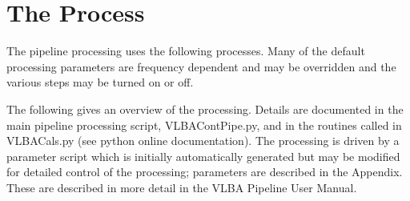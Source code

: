 \documentclass[11pt]{article}
\begin{document}
\section{The Process}

The pipeline processing uses the following processes.
Many of the default processing parameters are frequency dependent and
may be overridden and the various steps may be turned on or off.

The following gives an overview of the processing.
Details are documented in the main pipeline processing script,
VLBAContPipe.py, and in the routines called in VLBACals.py (see python
online documentation).
The processing is driven by a parameter script which is initially
automatically generated but may be modified for detailed control of
the processing; parameters are described in the Appendix.
These are described in more detail in the VLBA Pipeline User Manual.
\end{document}
